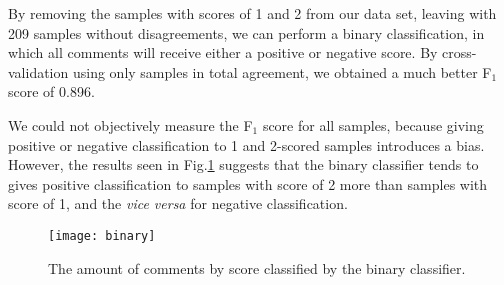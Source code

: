 
By removing the samples with scores of 1 and 2 from our data set, leaving with 209 samples without disagreements, we can perform a binary classification, in which all comments will receive either a positive or negative score.
By cross-validation using only samples in total agreement, we obtained a much better F$_1$ score of 0.896.

We could not objectively measure the F$_1$ score for all samples, because giving positive or negative classification to 1 and 2-scored samples introduces a bias.
However, the results seen in Fig.\ref{fig:binary} suggests that the binary classifier tends to gives positive classification to samples with score of 2 more than samples with score of 1, and the \emph{vice versa} for negative classification.

\begin{figure}[h]
\centering
\texttt{[image: binary]}
\caption{The amount of comments by score classified by the binary classifier.}
\label{fig:binary}
\end{figure}
